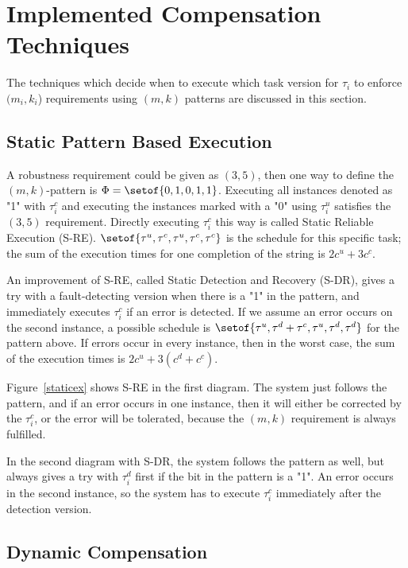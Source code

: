 \chapter{Implemented Compensation Techniques}
The techniques which decide when to execute which task version for $\tau_i$ to enforce $(m_i,k_i$) requirements using $(m,k)$ patterns are discussed in this section.
\section{Static Pattern Based Execution} 

A robustness requirement could be given as $(3,5)$, then one way to define the $(m,k)$-pattern is $\Phi=\setof{0,1,0,1,1}$. Executing all instances denoted as "1" with $\tau^c_i$ and executing the instances marked with a "0" using $\tau^u_i$  satisfies the $(3,5)$ requirement. Directly executing $\tau_i^c$ this way is called Static Reliable Execution (S-RE). $\setof{\tau^u, \tau^c, \tau^u, \tau^c, \tau^c}$ is the schedule for this specific task; the sum of the execution times for one completion of the string is $2c^u + 3c^c$. 

An improvement of S-RE, called Static Detection and Recovery (S-DR), gives a try with a fault-detecting version when there is a "1" in the pattern, and immediately executes $\tau_i^c$ if an error is detected. If we assume an error occurs on the second instance, a possible schedule is $\setof{\tau^u, \tau^d + \tau^c, \tau^u, \tau^d, \tau^d}$ for the pattern above. If errors occur in every instance, then in the worst case, the sum of the execution times is $2c^u + 3(c^d+c^c)$. 

Figure~\ref{staticex} shows S-RE in the first diagram. The system just follows the pattern, and if an error occurs in one instance, then it will either be corrected by the $\tau_i^c$, or the error will be tolerated, because the $(m,k)$ requirement is always fulfilled.

In the second diagram with S-DR, the system follows the pattern as well, but always gives a try with $\tau_i^d$ first if the bit in the pattern is a "1". An error occurs in the second instance, so the system has to execute $\tau_i^c$ immediately after the detection version.



\section{Dynamic Compensation}

